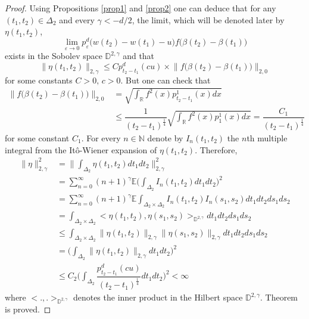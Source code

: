 \documentclass[10pt,a4paper]{amsart}
\newcommand{\D}{{\mathbb{D}}}
\newcommand{\E}{{\mathbb{E}}}
\newcommand{\N}{{\mathbb N}}
\newcommand{\R}{{\mathbb{R}}}
\begin{document}
\begin{proof}
Using Propositions \ref{prop1} and \ref{prop2} one can deduce that for any $(t_1,t_2)\in \Delta_2$ and every $\gamma <-d/2 $, the limit, which will be denoted later by $\eta(t_1,t_2)$,
$$ \lim_{\varepsilon \to 0} p^d_{\varepsilon}\big( w(t_{2})-w(t_1)-u \big) f\big( \beta(t_2)-\beta(t_1)\big )  $$
exists in the Sobolev space $\D^{2,\gamma}$ and that 
$$ \big \| \eta (t_1,t_2)  \big\| _{2,\gamma}  \leqslant C p^d_{t_{2}-t_1}( cu) \times \big \| f\big( \beta(t_2)-\beta(t_1)\big )  \big\| _{2,0}  $$
for some constants $C>0,\, c>0$. But one can check that 
\begin{align*}  
\big \| f\big( \beta(t_2)-\beta(t_1)\big )  \big\| _{2,0} 
&=\sqrt{ \int_{\R} f^2(x)p_{t_2-t_1}^1(x)dx }\\
& \leqslant \dfrac{1}{(t_2-t_1) ^{ \frac{1}{4} } }  \sqrt{ \int_{\R} f^2(x)p_{1}^1(x)dx } =\dfrac{C_1}{(t_2-t_1) ^{ \frac{1}{4} } }    
\end{align*}
for some constant $C_1$. For every $n\in \N$ denote by $I_n(t_1,t_2)$ the $n$th multiple integral from the
It\^{o}-Wiener expansion of $\eta(t_1, t_2)$. Therefore,\\
\begin{align*}
\big \| \eta \big\| _{2,\gamma} ^2
&=\Big \| \int_{\Delta_2}  \eta (t_1,t_2)dt_1dt_2\Big\| _{2,\gamma} ^2\\
&= \sum_{n= 0}^{\infty} (n+1)^{\gamma }\E  \Big( \int_{\Delta_2}  I_n(t_1,t_2) dt_1 dt_2 \Big)^2    \\
&= \sum_{n= 0}^{\infty} (n+1)^{\gamma }\E  \int_{\Delta_2 \times \Delta_2}  I_n (t_1,t_2)I_n (s_1,s_2) dt_1 dt_2 ds_1ds_2    \\
&=  \int_{\Delta_2 \times \Delta_2} \Big< \eta (t_1,t_2),\eta (s_1,s_2) \Big>_{\D^{2,\gamma}}  dt_1 dt_2 ds_1ds_2     \\
&\leqslant  \int_{\Delta_2 \times \Delta_2} \big \| \eta (t_1,t_2)  \big\| _{2,\gamma} \big \| \eta (s_1,s_2)  \big\| _{2,\gamma} dt_1 dt_2 ds_1ds_2     \\
&=  \Big( \int_{\Delta_2 } \big \| \eta (t_1,t_2)  \big\| _{2,\gamma}   dt_1dt_2  \Big)^2    \\
&\leqslant C_2  \Big( \int_{\Delta_2 }  \dfrac{p^d_{t_{2}-t_1}( cu)  }{(t_2-t_1) ^{ \frac{1}{4} } }  dt_1dt_2   \Big)^2   <\infty
\end{align*}
where $\big< .,. \big>_{\D^{2,\gamma}}$ denotes the inner product in the Hilbert space $\D^{2,\gamma}$.
Theorem is proved.
\end{proof}
\end{document}

